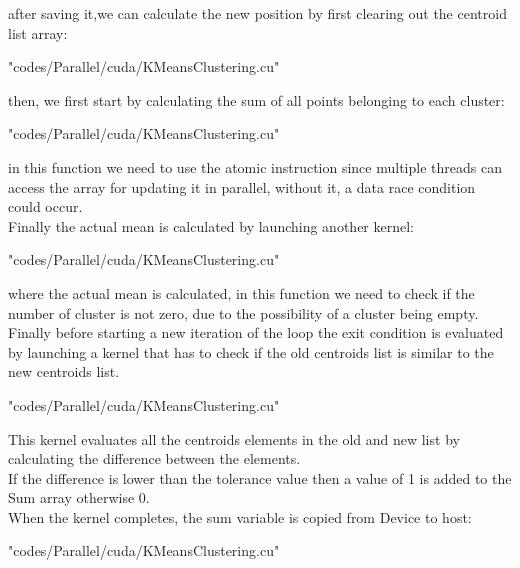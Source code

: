 \documentclass[10pt,twocolumn,letterpaper]{article}
\begin{document}
after saving it,we can calculate the new position by first clearing out the centroid list array:\\
\begin{lstinputlisting}[language=C,style=CSnippetStyle,caption=CUDA Centroid Position Update,firstline=179,lastline=180]{
	"codes/Parallel/cuda/KMeansClustering.cu"}
\end{lstinputlisting}
then, we first start by calculating the sum of all points belonging to each cluster:\\
\begin{lstinputlisting}[language=C,style=CSnippetStyle,caption=CUDA Mean Sum Calculation,firstline=46,lastline=59]{
	"codes/Parallel/cuda/KMeansClustering.cu"}
\end{lstinputlisting}
in this function we need to use the atomic instruction since multiple threads can access the array for updating it in parallel, without 
it, a data race condition could occur.\\
Finally the actual mean is calculated by launching another kernel:\\
\begin{lstinputlisting}[language=C,style=CSnippetStyle,caption=CUDA Mean Calculation,firstline=33,lastline=45]{
	"codes/Parallel/cuda/KMeansClustering.cu"}
\end{lstinputlisting}
where the actual mean is calculated, in this function we need to check if the number of cluster is not zero, due to the possibility of
a cluster being empty.\\
Finally before starting a new iteration of the loop the exit condition is evaluated by launching a kernel that has to check if the old
centroids list is similar to the new centroids list.\\
\begin{lstinputlisting}[language=C,style=CSnippetStyle,caption=CUDA Exit Condition Calculator Kernel,firstline=18,lastline=32]{
	"codes/Parallel/cuda/KMeansClustering.cu"}
\end{lstinputlisting}
This kernel evaluates all the centroids elements in the old and new list by calculating the difference between the elements.\\
If the difference is lower than the tolerance value then a value of 1 is added to the Sum array otherwise 0.\\
When the kernel completes, the sum variable is copied from Device to host:\\
\begin{lstinputlisting}[language=C,style=CSnippetStyle,caption=CUDA Exit Condition Sum Copy,firstline=128,lastline=128]{
	"codes/Parallel/cuda/KMeansClustering.cu"}
\end{lstinputlisting}
\end{document}
